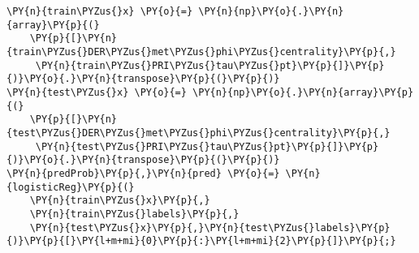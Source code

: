 {\par%
\vspace{1\baselineskip}%
}%
\begin{notebookcell}[]%
\begin{addmargin}[\cellleftmargin]{0em}%
{\smaller%
\par%
%
\vspace{-1\smallerfontscale}%
\begin{Verbatim}[commandchars=\\\{\}]
\PY{n}{train\PYZus{}x} \PY{o}{=} \PY{n}{np}\PY{o}{.}\PY{n}{array}\PY{p}{(}
    \PY{p}{[}\PY{n}{train\PYZus{}DER\PYZus{}met\PYZus{}phi\PYZus{}centrality}\PY{p}{,}
     \PY{n}{train\PYZus{}PRI\PYZus{}tau\PYZus{}pt}\PY{p}{]}\PY{p}{)}\PY{o}{.}\PY{n}{transpose}\PY{p}{(}\PY{p}{)}
\PY{n}{test\PYZus{}x} \PY{o}{=} \PY{n}{np}\PY{o}{.}\PY{n}{array}\PY{p}{(}
    \PY{p}{[}\PY{n}{test\PYZus{}DER\PYZus{}met\PYZus{}phi\PYZus{}centrality}\PY{p}{,}
     \PY{n}{test\PYZus{}PRI\PYZus{}tau\PYZus{}pt}\PY{p}{]}\PY{p}{)}\PY{o}{.}\PY{n}{transpose}\PY{p}{(}\PY{p}{)}
\PY{n}{predProb}\PY{p}{,}\PY{n}{pred} \PY{o}{=} \PY{n}{logisticReg}\PY{p}{(}
    \PY{n}{train\PYZus{}x}\PY{p}{,}
    \PY{n}{train\PYZus{}labels}\PY{p}{,}
    \PY{n}{test\PYZus{}x}\PY{p}{,}\PY{n}{test\PYZus{}labels}\PY{p}{)}\PY{p}{[}\PY{l+m+mi}{0}\PY{p}{:}\PY{l+m+mi}{2}\PY{p}{]}\PY{p}{;}
\end{Verbatim}
%
\par%
\vspace{-1\smallerfontscale}}%
\end{addmargin}
\end{notebookcell}